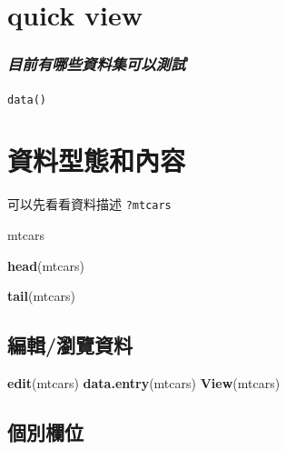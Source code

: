 \documentclass[]{book}
\newenvironment{Shaded}{\begin{snugshade}}{\end{snugshade}}
\newcommand{\KeywordTok}[1]{\textcolor[rgb]{0.13,0.29,0.53}{\textbf{#1}}}
\newcommand{\NormalTok}[1]{#1}
\theoremstyle{definition}
\theoremstyle{definition}
\theoremstyle{definition}
\theoremstyle{remark}
\begin{document}
\section{quick view}\label{quick-view}

\subsubsection{\texorpdfstring{\emph{目前有哪些資料集可以測試}}{目前有哪些資料集可以測試}}

\texttt{data()}

\section{資料型態和內容}

可以先看看資料描述 \texttt{?mtcars}

\begin{Shaded}
\begin{Highlighting}[]
\NormalTok{mtcars}
\end{Highlighting}
\end{Shaded}

\begin{Shaded}
\begin{Highlighting}[]
\KeywordTok{head}\NormalTok{(mtcars)}
\end{Highlighting}
\end{Shaded}

\begin{Shaded}
\begin{Highlighting}[]
\KeywordTok{tail}\NormalTok{(mtcars)}
\end{Highlighting}
\end{Shaded}

\subsection{編輯/瀏覽資料}

\begin{Shaded}
\begin{Highlighting}[]
\KeywordTok{edit}\NormalTok{(mtcars)}
\KeywordTok{data.entry}\NormalTok{(mtcars)}
\KeywordTok{View}\NormalTok{(mtcars)}
\end{Highlighting}
\end{Shaded}

\subsection{個別欄位}
\end{document}
